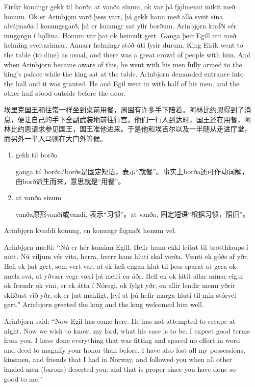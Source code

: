 \begin{paracol}{2}
    Eiríkr konungr gekk til borða at vanða sínum, ok var þá fjǫlmenni mikit með honum. Ok er Arinbjǫm varð þess varr, þá gekk hann með alla sveit sína alvápnaða í konungsgarð, þá er konungr sat yfir borðum. Arinbjǫrn krafði sér inngǫngu í hǫllina. Honum var þat ok heimult gert. Ganga þeir Egill inn með helming sveitarinnar. Annarr helmingr stóð úti fyrir durum.
    \switchcolumn
    King Eirik went to the table (to dine) as usual, and there was a great crowd of people with him. And when Arinbjorn became aware of this, he went with his men fully armed to the king's palace while the king sat at the table. Arinbjorn demanded entrance into the hall and it was granted. He and Egil went in with half of his men, and the other half stood outside before the door.
\end{paracol}

\begin{translation*}{}
    埃里克国王和往常一样坐到桌前用餐，周围有许多手下陪着。阿林比约恩得到了消息，便让自己的手下全副武装地前往行宫。他们一行人到达时，国王还在用餐，阿林比约恩请求参见国王，国王准他进来。于是他和埃吉尔以及一半随从走进厅堂，而另外一半人马则在大门外等候。
\end{translation*}
\begin{grammar*}{}
    \begin{enumerate}[leftmargin=*]
        \item gekk til borða

              ganga til borða/borðs是固定短语，表示“就餐”。事实上borða还可作动词解，由borð派生而来，意思就是“用餐”。
        \item at vanða sínum

              vanða原形vanði或vandi, 表示“习惯”。at vanða, 固定短语“根据习惯，照旧”。
    \end{enumerate}
\end{grammar*}
\begin{paracol}{2}
    Arinbjǫrn kvaddi konung, en konungr fagnaði honum vel.

    Arinbjǫrn mælti: ``Nú er hér kominn Egill. Hefir hann ekki leitat til brotthlaups í nótt. Nú viljum vér vita, herra, hverr hans hluti skal verða. Vænti ek góðs af yðr. Hefi ek þat gert, sem vert var, at ek hefi engan hlut til þess sparat at gera ok mæla svá, at yðvarr vegr væri þá meiri en áðr. Hefi ek ok látit allar mínar eigur ok frændr ok vini, er ek átta í Nóregi, ok fylgt yðr, en allir lendir menn yðrir skilðust við yðr, ok er þat makligt, því at þú hefir marga hluti til mín stórvel gert."
    \switchcolumn
    Arinbjorn greeted the king and the king welcomed him well.

    Arinbjorn said: ``Now Egil has come here. He has not attempted to escape at night. Now we wish to know, my lord, what his case is to be. I expect good terms from you. I have done everything that was fitting and spared no effort in word and deed to magnify your honor than before. I have also lost all my possessions, kinsmen, and friends that I had in Norway, and followed you when all other landed-men (barons) deserted you; and that is proper since you have done so good to me.''
\end{paracol}

